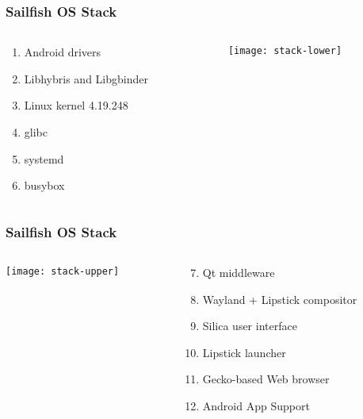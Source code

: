 \documentclass[
	notes=none,
	aspectratio=169
]{beamer}
\begin{document}

\begin{frame}
\frametitle{Sailfish OS Stack}

\begin{columns}[T]
\begin{column}[T]{0.5\textwidth}
\setlength{\parskip}{0.5em}

\vspace{1.5cm}
\begin{enumerate}
\setlength{\parskip}{0.5em}
\item Android drivers
\item Libhybris and Libgbinder
\item Linux kernel 4.19.248
\item glibc
\item systemd
\item busybox
\end{enumerate}

\end{column}
\begin{column}[T]{0.5\textwidth}
\setlength{\parskip}{0.5em}

\vspace{0.0cm}
\texttt{[image: stack-lower]}

\end{column}
\end{columns}

\end{frame}
\note{
}


\begin{frame}
\frametitle{Sailfish OS Stack}

\begin{columns}[T]
\begin{column}[T]{0.5\textwidth}
\setlength{\parskip}{0.5em}

\vspace{0.0cm}
\hspace{1.3cm}
\texttt{[image: stack-upper]}

\end{column}
\begin{column}[T]{0.5\textwidth}
\setlength{\parskip}{0.5em}

\vspace{1.5cm}
\begin{enumerate}
\setcounter{enumi}{6}
\setlength{\parskip}{0.5em}
\item Qt middleware
\item Wayland + Lipstick compositor
\item Silica user interface
\item Lipstick launcher
\item Gecko-based Web browser
\item Android App Support
\end{enumerate}

\end{column}
\end{columns}

\end{frame}
\note{
}
\end{document}
